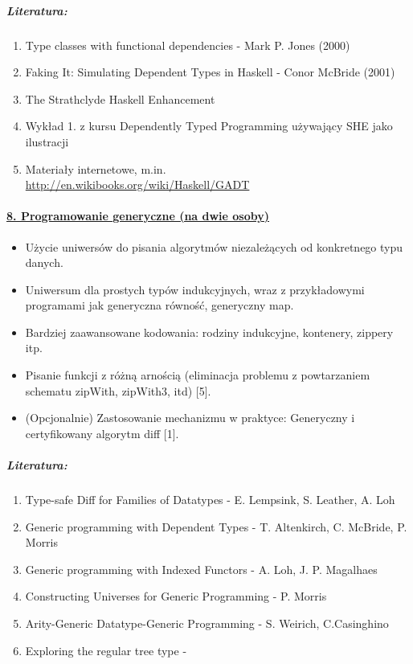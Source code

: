 \documentclass[10pt, a4paper]{article}
\begin{document}
\subparagraph{Literatura:}

\begin{enumerate}
\addtolength{\itemsep}{-0.5\baselineskip}

 \item Type classes with functional dependencies - Mark P. Jones (2000)
 \item Faking It: Simulating Dependent Types in Haskell - Conor McBride (2001) 
 \item The Strathclyde Haskell Enhancement
 \item Wykład 1. z kursu Dependently Typed Programming używający SHE jako ilustracji
 \item Materiały internetowe, m.in. \\
       \url{http://en.wikibooks.org/wiki/Haskell/GADT}

\end{enumerate}

\paragraph{\underline{8. Programowanie generyczne (na dwie osoby)}}


\begin{itemize}
\addtolength{\itemsep}{-0.5\baselineskip}

\item Użycie uniwersów do pisania algorytmów niezależących od konkretnego typu danych.
\item Uniwersum dla prostych typów indukcyjnych, wraz z przykładowymi programami jak generyczna równość, generyczny map.
\item Bardziej zaawansowane kodowania: rodziny indukcyjne, kontenery, zippery itp.
\item Pisanie funkcji z różną arnością (eliminacja problemu z powtarzaniem schematu zipWith, zipWith3, itd) [5].
\item (Opcjonalnie) Zastosowanie mechanizmu w praktyce: Generyczny i certyfikowany algorytm diff [1].

\end{itemize}

\subparagraph{Literatura:}


\begin{enumerate}
\addtolength{\itemsep}{-0.5\baselineskip}

\item  Type-safe Diff for Families of Datatypes - E. Lempsink, S. Leather, A. Loh
\item  Generic programming with Dependent Types - T. Altenkirch, C. McBride, P. Morris
\item  Generic programming with Indexed Functors - A. Loh, J. P. Magalhaes
\item  Constructing Universes for Generic Programming - P. Morris
\item  Arity-Generic Datatype-Generic Programming - S. Weirich, C.Casinghino
\item  Exploring the regular tree type -

\end{enumerate}
\end{document}
